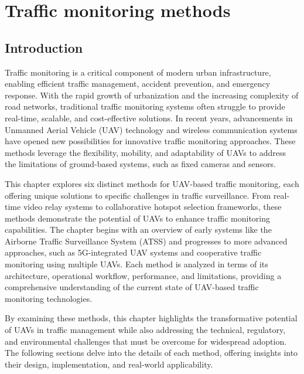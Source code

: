 
\chapter{Traffic monitoring methods}


\section*{Introduction}

Traffic monitoring is a critical component of modern urban infrastructure, enabling efficient traffic management, accident prevention, and emergency response. With the rapid growth of urbanization and the increasing complexity of road networks, traditional traffic monitoring systems often struggle to provide real-time, scalable, and cost-effective solutions. In recent years, advancements in Unmanned Aerial Vehicle (UAV) technology and wireless communication systems have opened new possibilities for innovative traffic monitoring approaches. These methods leverage the flexibility, mobility, and adaptability of UAVs to address the limitations of ground-based systems, such as fixed cameras and sensors.

\vspace{\baselineskip} %

This chapter explores six distinct methods for UAV-based traffic monitoring, each offering unique solutions to specific challenges in traffic surveillance. From real-time video relay systems to collaborative hotspot selection frameworks, these methods demonstrate the potential of UAVs to enhance traffic monitoring capabilities. The chapter begins with an overview of early systems like the Airborne Traffic Surveillance System (ATSS) and progresses to more advanced approaches, such as 5G-integrated UAV systems and cooperative traffic monitoring using multiple UAVs. Each method is analyzed in terms of its architecture, operational workflow, performance, and limitations, providing a comprehensive understanding of the current state of UAV-based traffic monitoring technologies.

\vspace{\baselineskip} %

By examining these methods, this chapter highlights the transformative potential of UAVs in traffic management while also addressing the technical, regulatory, and environmental challenges that must be overcome for widespread adoption. The following sections delve into the details of each method, offering insights into their design, implementation, and real-world applicability.


